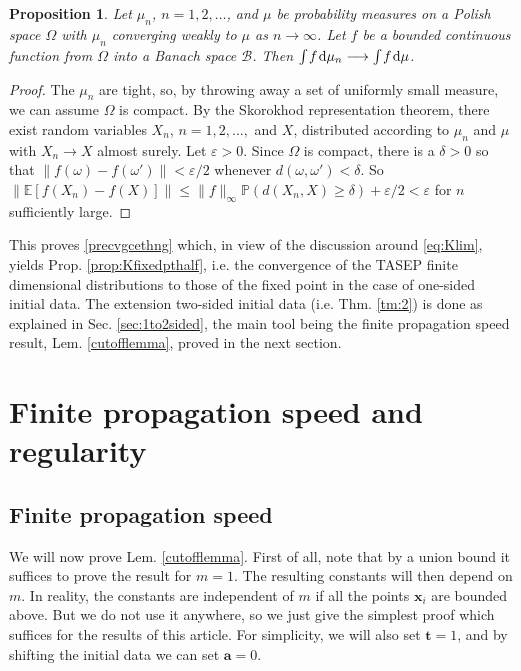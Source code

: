 \documentclass[letterpaper,reqno,11pt,oneside,final]{amsart}
\newtheorem{prop}[thm]{Proposition}
\theoremstyle{definition}
\newcommand{\pp}{\mathbb{P}}
\newcommand{\ee}{\mathbb{E}}
\newcommand{\ep}{\varepsilon}
\newcommand{\ts}{\hspace{0.1em}}
\newcommand{\tsm}{\hspace{-0.1em}}
\renewcommand{\d}{\mathrm{d}}
\newcommand{\ft}{\mathbf{t}}
\newcommand{\fx}{\mathbf{x}}
\newcommand{\fa}{\mathbf{a}}
\numberwithin{equation}{section}
\begin{document}
\begin{prop}\label{banach}
Let $\mu_n$, $n=1,2,\ldots$, and $\mu$ be probability measures on a Polish space $\Omega$ with $\mu_n$ converging weakly to $\mu$ as $n\to\infty$.
Let $f$ be a bounded continuous function from $\Omega$ into a Banach space $\mathscr{B}$.
Then $\int\tsm f\ts\d\mu_n\longrightarrow \int\tsm f\ts\d\mu$.
\end{prop}

\begin{proof}
The $\mu_n$ are tight, so, by throwing away a set of uniformly small measure, we can assume $\Omega$ is compact.
By the Skorokhod representation theorem, there exist random variables $X_n$, $n=1,2,\ldots,$ and $X$, distributed according to $\mu_n$ and $\mu$ with $X_n\longrightarrow X$ almost surely.
Let $\ep>0$.
Since $\Omega$ is compact, there is a $\delta>0$ so that $\| f (\omega)- f(\omega')\|< \ep/2$ whenever $d(\omega,\omega')< \delta$.
So $\|\ee[ f(X_n)-f(X) ] \| \le \|f\|_\infty \pp(d(X_n,X) \ge \delta) + \ep/2 <\ep$ for $n$ sufficiently large.
\end{proof}

This proves \eqref{precvgcethng} which, in view of the discussion around \eqref{eq:Klim}, yields Prop. \ref{prop:Kfixedpthalf}, i.e. the convergence of the TASEP finite dimensional distributions to those of the fixed point in the case of one-sided initial data.
The extension two-sided initial data (i.e. Thm. \ref{tm:2}) is done as explained in Sec. \ref{sec:1to2sided}, the main tool being the finite propagation speed result, Lem. \ref{cutofflemma}, proved in the next section.

\section{Finite propagation speed and regularity}\label{sec:finitespeedandreg}

\subsection{Finite propagation speed}\label{app:cutoff}

We will now prove Lem. \ref{cutofflemma}.
First of all, note that by a union bound it suffices to prove the result for $m=1$.
The resulting constants will then depend on $m$.
In reality, the constants are independent of $m$ if all the points $\fx_i$ are bounded above.
But we do not use it anywhere, so we just give the simplest proof which suffices for the results of this article.
For simplicity, we will also set $\ft=1$, and by shifting the initial data we can set $\fa =0$.
\end{document}
